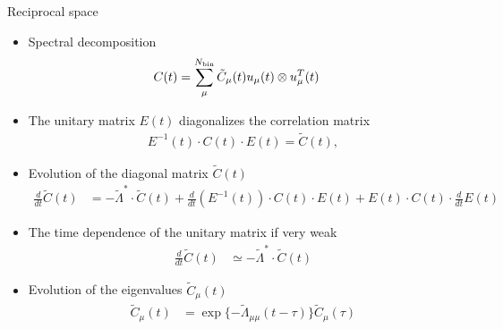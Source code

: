 \documentclass{beamer}
\newcommand{\esc}{\!\cdot\!}
\begin{document}
\begin{frame}{Reciprocal space}
\begin{itemize}
  \item Spectral decomposition
\begin{align}
  C(t)&=\sum_\mu^{N_{\rm bin}}\tilde{C}_\mu(t) u_\mu(t) \otimes u_\mu^T(t)
\nonumber
\end{align}

\item The unitary matrix $E(t)$ diagonalizes the correlation matrix
\begin{align}
  E^{-1}(t)\esc C(t)\esc E(t)=\tilde{C}(t),
\nonumber
\end{align}

\item Evolution of the diagonal matrix $\tilde{C}(t)$
\begin{align}
\frac{d}{dt}  \tilde{C}(t)&=-\tilde{\Lambda}^*\esc \tilde{C}(t)
  +\frac{d }{dt}(E^{-1}(t)) \esc C(t)\esc E(t)
  +E(t)\esc C(t)\esc \frac{d }{dt}E(t)  
\nonumber
\end{align}

\item The time dependence of the unitary matrix if very weak
\begin{align}
\frac{d}{dt}  \tilde{C}(t)&\simeq-\tilde{\Lambda}^*\esc \tilde{C}(t)
\nonumber
\end{align}

\item Evolution of the eigenvalues $\tilde{C}_{\mu}(t)$
\begin{align}
  \tilde{C}_\mu(t)&=\exp\{-\tilde{\Lambda}_{\mu\mu} (t-\tau)\}  \tilde{C}_\mu(\tau)
  \nonumber
\end{align}
\end{itemize}
\end{frame}
\end{document}
